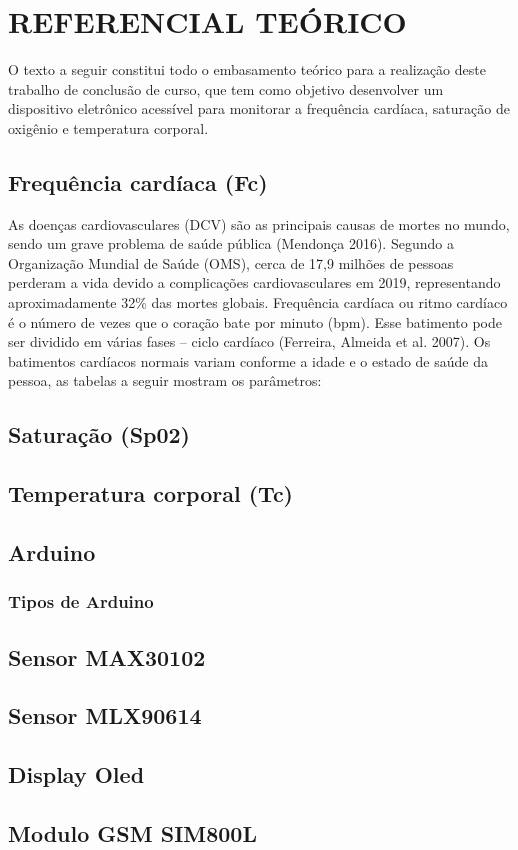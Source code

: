 \section{REFERENCIAL TEÓRICO}

O texto a seguir constitui todo o embasamento teórico para a realização deste trabalho de conclusão de curso, que tem como objetivo desenvolver um dispositivo eletrônico acessível para monitorar a frequência cardíaca, saturação de oxigênio e temperatura corporal.

\subsection{Frequência cardíaca (Fc)}

As doenças cardiovasculares (DCV) são as principais causas de mortes no mundo, sendo um grave problema de saúde pública (Mendonça 2016). Segundo a Organização Mundial de Saúde (OMS), cerca de 17,9 milhões de pessoas perderam a vida devido a complicações cardiovasculares em 2019, representando aproximadamente 32\% das mortes globais.
Frequência cardíaca ou ritmo cardíaco é o número de vezes que o coração bate por minuto (bpm). Esse batimento pode ser dividido em várias fases – ciclo cardíaco (Ferreira, Almeida et al. 2007). Os batimentos cardíacos normais variam conforme a idade e o estado de saúde da pessoa, as tabelas a seguir mostram os parâmetros:

\subsection{Saturação (Sp02)}

\subsection{Temperatura corporal (Tc)}

\subsection{Arduino}

\subsubsection{Tipos de Arduino}




\subsection{Sensor MAX30102}

\subsection{Sensor MLX90614}

\subsection{Display Oled}

\subsection{Modulo GSM SIM800L}